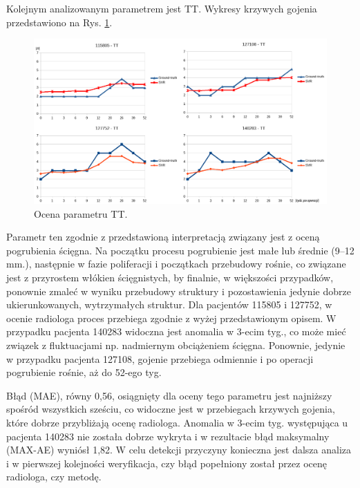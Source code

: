 Kolejnym analizowanym parametrem jest TT. Wykresy krzywych gojenia przedstawiono na Rys. \ref{fig:TT}.    
\begin{figure}[h!]
	\centering
	\includegraphics[width=1\textwidth]{figures/TT.png}
	\caption{Ocena parametru TT.}\label{fig:TT}
\end{figure}
Parametr ten zgodnie z przedstawioną interpretacją związany jest z oceną pogrubienia ścięgna. Na początku procesu pogrubienie jest małe lub średnie (9--12 mm.), następnie w fazie poliferacji i początkach przebudowy rośnie, co związane jest z przyrostem włókien ścięgnistych, by finalnie, w większości przypadków, ponownie zmaleć w wyniku przebudowy struktury i pozostawienia jedynie dobrze ukierunkowanych, wytrzymałych struktur. Dla pacjentów 115805 \linebreak i 127752, w ocenie radiologa proces przebiega zgodnie z wyżej przedstawionym opisem. W przypadku pacjenta 140283 widoczna jest anomalia w 3-ecim tyg., co może mieć związek z fluktuacjami np. nadmiernym obciążeniem ścięgna. Ponownie, jedynie w przypadku pacjenta 127108, gojenie przebiega odmiennie i po operacji pogrubienie rośnie, aż do 52-ego tyg. 

Błąd (MAE), równy 0,56, osiągnięty dla oceny tego parametru jest najniższy spośród wszystkich sześciu, co widoczne jest w przebiegach krzywych gojenia, które dobrze przybliżają ocenę radiologa. Anomalia w 3-ecim tyg. występująca u pacjenta 140283 nie została dobrze wykryta i w rezultacie błąd maksymalny (MAX-AE) wyniósł 1,82. W celu detekcji przyczyny konieczna jest dalsza analiza i w pierwszej kolejności weryfikacja, czy błąd popełniony został przez ocenę radiologa, czy metodę.

